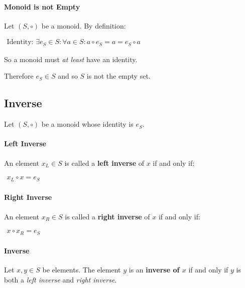 \paragraph{Monoid is not Empty}

Let $(S, \circ)$ be a monoid. By definition:

\begin{math}
  \begin{array}{c}
    \text{Identity: } \exists e_S \in S : \forall a \in S: a \circ e_S = a = e_S \circ a
  \end{array}
\end{math}

So a monoid must \textit{at least} have an identity.

Therefore $e_S \in S $ and so $S$ is not the empty set.


\subsection{Inverse}
\label{sec:inverse}

Let $(S, \circ)$ be a monoid whose identity is $e_S$.

\paragraph{Left Inverse}
An element $x_L \in S$ is called a \textbf{left inverse} of $x$ if and
only if:

\begin{math}
  \begin{array}{c}
    x_L \circ x = e_S
  \end{array}
\end{math}


\paragraph{Right Inverse}
An element $x_R \in S$ is called a \textbf{right inverse} of $x$ if and
only if:

\begin{math}
  \begin{array}{c}
    x \circ x_R = e_S
  \end{array}
\end{math}

\paragraph{Inverse}

Let $x , y \in S $ be elements. The element $y$ is an \textbf{inverse
  of $x$} if and only if $y$ is both a \textit{left inverse} and
\textit{right inverse}.


